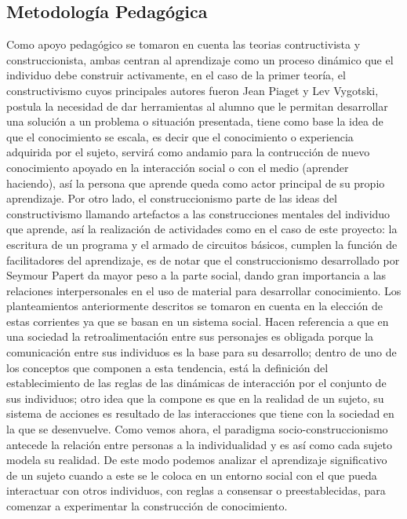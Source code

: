 \documentclass[letterpaper,10pt]{article}
\begin{document}
\subsection{Metodología Pedagógica}

Como apoyo pedagógico se tomaron en cuenta las teorias contructivista y
construccionista, ambas centran al aprendizaje como un  proceso dinámico que el individuo
debe construir activamente, en el caso de la primer teoría, el constructivismo
cuyos principales autores fueron Jean Piaget y Lev Vygotski, postula la
necesidad de dar herramientas al alumno  que le permitan desarrollar
una solución a un problema o situación presentada, tiene como base la idea de
que el conocimiento se escala, es decir que el conocimiento o experiencia
adquirida por el sujeto, servirá como andamio para la contrucción de nuevo
conocimiento apoyado en la interacción social o con el medio (aprender haciendo), 
así la persona que aprende queda como actor principal de su propio
aprendizaje. Por otro lado, el construccionismo parte de las ideas del
constructivismo llamando artefactos a las construcciones mentales del individuo
que aprende, así la realización de  actividades como en el caso de
este proyecto: la escritura de un programa y el armado de circuitos básicos,
cumplen la función de facilitadores del aprendizaje, es de notar que el
construccionismo desarrollado por Seymour Papert  da mayor peso a la parte social, dando gran importancia a
las relaciones interpersonales en el uso de material para desarrollar
conocimiento.\newline
Los planteamientos anteriormente descritos se tomaron en cuenta en la elección de estas
corrientes ya que se basan en un sistema social. Hacen referencia a que en una sociedad
la retroalimentación entre sus personajes es obligada porque la comunicación entre 
sus individuos es la base para su desarrollo; dentro de uno de los conceptos que componen 
a esta tendencia, está la definición del establecimiento de las reglas de las 
dinámicas de interacción por el conjunto de sus individuos; otro idea que la 
compone es que en la realidad de un sujeto, su sistema de acciones es
resultado de las interacciones que tiene con la sociedad en la que se desenvuelve. 
Como vemos ahora, el paradigma socio-construccionismo antecede la 
relación entre personas a la individualidad y es así como cada sujeto modela su 
realidad. De este modo podemos analizar el aprendizaje significativo de un
sujeto cuando a este se le coloca en un entorno social con el que pueda interactuar
con otros individuos, con reglas a consensar o preestablecidas, para comenzar
a experimentar la construcción de conocimiento.
\end{document}
